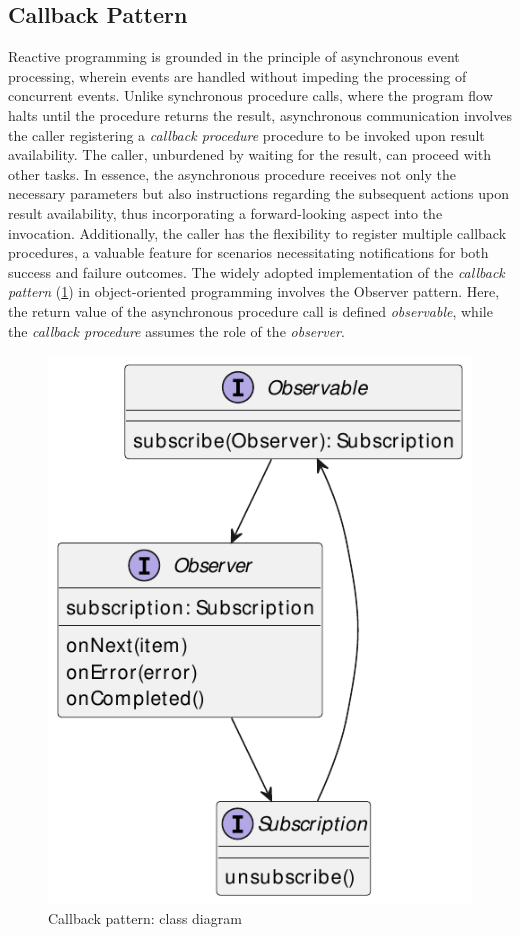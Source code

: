 \documentclass[12pt,a4paper,openright,twoside]{book}
\begin{document}
\subsection{Callback Pattern}

Reactive programming is grounded in the principle of asynchronous event processing, wherein events are handled without impeding the processing of concurrent events. Unlike synchronous procedure calls, where the program flow halts until the procedure returns the result, asynchronous communication involves the caller registering a \textit{callback procedure} procedure to be invoked upon result availability. The caller, unburdened by waiting for the result, can proceed with other tasks. In essence, the asynchronous procedure receives not only the necessary parameters but also instructions regarding the subsequent actions upon result availability, thus incorporating a forward-looking aspect into the invocation. Additionally, the caller has the flexibility to register multiple callback procedures, a valuable feature for scenarios necessitating notifications for both success and failure outcomes. The widely adopted implementation of the \textit{callback pattern} (\cref{fig:callback-pattern}) in object-oriented programming involves the Observer pattern. Here, the return value of the asynchronous procedure call is defined \textit{observable}, while the \textit{callback procedure} assumes the role of the \textit{observer}.

\begin{figure}
    \centering
    \includegraphics[width=.5\linewidth]{figures/callback-pattern.pdf}
    \caption{Callback pattern: class diagram}
    \label{fig:callback-pattern}
\end{figure}
\end{document}

